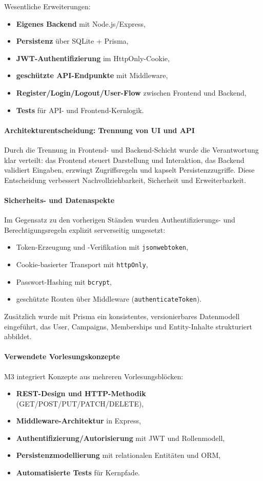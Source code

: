 Wesentliche Erweiterungen:
\begin{itemize}
  \item \textbf{Eigenes Backend} mit Node.js/Express,
  \item \textbf{Persistenz} über SQLite + Prisma,
  \item \textbf{JWT-Authentifizierung} im HttpOnly-Cookie,
  \item \textbf{geschützte API-Endpunkte} mit Middleware,
  \item \textbf{Register/Login/Logout/User-Flow} zwischen Frontend und Backend,
  \item \textbf{Tests} für API- und Frontend-Kernlogik.
\end{itemize}

\paragraph{Architekturentscheidung: Trennung von UI und API}
Durch die Trennung in Frontend- und Backend-Schicht wurde die Verantwortung
klar verteilt:
das Frontend steuert Darstellung und Interaktion, das Backend validiert
Eingaben, erzwingt Zugriffsregeln und kapselt Persistenzzugriffe.
Diese Entscheidung verbessert Nachvollziehbarkeit, Sicherheit und Erweiterbarkeit.

\paragraph{Sicherheits- und Datenaspekte}
Im Gegensatz zu den vorherigen Ständen wurden Authentifizierungs- und
Berechtigungsregeln explizit serverseitig umgesetzt:
\begin{itemize}
  \item Token-Erzeugung und -Verifikation mit \texttt{jsonwebtoken},
  \item Cookie-basierter Transport mit \texttt{httpOnly},
  \item Passwort-Hashing mit \texttt{bcrypt},
  \item geschützte Routen über Middleware (\texttt{authenticateToken}).
\end{itemize}
Zusätzlich wurde mit Prisma ein konsistentes, versionierbares
Datenmodell eingeführt, das User, Campaigns, Memberships und Entity-Inhalte
strukturiert abbildet.

\paragraph{Verwendete Vorlesungskonzepte}
M3 integriert Konzepte aus mehreren Vorlesungsblöcken:
\begin{itemize}
  \item \textbf{REST-Design und HTTP-Methodik} (GET/POST/PUT/PATCH/DELETE),
  \item \textbf{Middleware-Architektur} in Express,
  \item \textbf{Authentifizierung/Autorisierung} mit JWT und Rollenmodell,
  \item \textbf{Persistenzmodellierung} mit relationalen Entitäten und ORM,
  \item \textbf{Automatisierte Tests} für Kernpfade.
\end{itemize}

